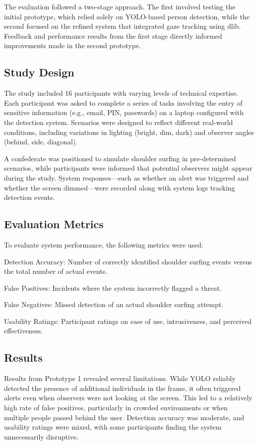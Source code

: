 \documentclass[12pt]{article}
\theoremstyle{plain}
\theoremstyle{definition}
\begin{document}
The evaluation followed a two-stage approach. The first involved testing the initial prototype, which relied solely on YOLO-based person detection, while the second focused on the refined system that integrated gaze tracking using dlib. Feedback and performance results from the first stage directly informed improvements made in the second prototype.

\subsection{Study Design}
The study included 16 participants with varying levels of technical expertise. Each participant was asked to complete a series of tasks involving the entry of sensitive information (e.g., email, PIN, passwords) on a laptop configured with the detection system. Scenarios were designed to reflect different real-world conditions, including variations in lighting (bright, dim, dark) and observer angles (behind, side, diagonal).

A confederate was positioned to simulate shoulder surfing in pre-determined scenarios, while participants were informed that potential observers might appear during the study. System responses—such as whether an alert was triggered and whether the screen dimmed—were recorded along with system logs tracking detection events.

\subsection{Evaluation Metrics}
To evaluate system performance, the following metrics were used:

Detection Accuracy: Number of correctly identified shoulder surfing events versus the total number of actual events.

False Positives: Incidents where the system incorrectly flagged a threat.

False Negatives: Missed detection of an actual shoulder surfing attempt.

Usability Ratings: Participant ratings on ease of use, intrusiveness, and perceived effectiveness.

\subsection{Results}
Results from Prototype 1 revealed several limitations. While YOLO reliably detected the presence of additional individuals in the frame, it often triggered alerts even when observers were not looking at the screen. This led to a relatively high rate of false positives, particularly in crowded environments or when multiple people passed behind the user. Detection accuracy was moderate, and usability ratings were mixed, with some participants finding the system unnecessarily disruptive.
\end{document}
